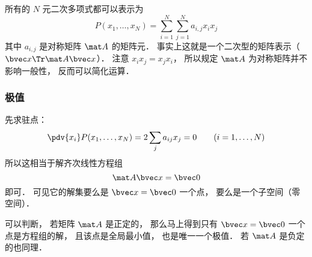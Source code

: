 

所有的 $N$ 元二次多项式都可以表示为
\begin{equation}
P(x_1,\dots,x_N) = \sum_{i=1}^N\sum_{j=1}^N a_{i,j}x_i x_j
\end{equation}
其中 $a_{i,j}$ 是对称矩阵 $\mat A$ 的矩阵元． 事实上这就是一个二次型的矩阵表示（$\bvec x\Tr \mat A \bvec x$）． 注意 $x_i x_j = x_j x_i$， 所以规定 $\mat A$ 为对称矩阵并不影响一般性， 反而可以简化运算．

\subsubsection{极值}
先求驻点：
\begin{equation}
\pdv{x_i}P(x_1,\dots,x_N) = 2\sum_j a_{ij} x_j = 0 \qquad (i = 1,\dots,N)
\end{equation}
所以这相当于解齐次线性方程组
\begin{equation}
\mat A \bvec x = \bvec 0
\end{equation}
即可． 可见它的解集要么是 $\bvec x = \bvec 0$ 一个点， 要么是一个子空间（零空间）．

可以判断， 若矩阵 $\mat A$ 是正定的， 那么马上得到只有 $\bvec x = \bvec 0$ 一个点是方程组的解， 且该点是全局最小值， 也是唯一一个极值． 若 $\mat A$ 是负定的也同理．
